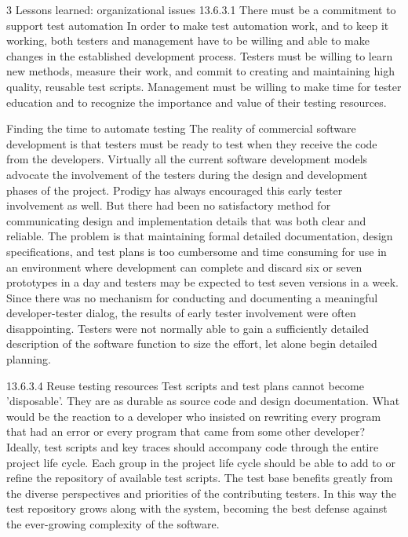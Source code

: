 3 Lessons learned: organizational issues
13.6.3.1 There must be a commitment to support test automation
In order to make test automation work, and to keep it working, both testers
and management have to be willing and able to make changes in the established
development process.
Testers must be willing to learn new methods, measure their work, and
commit to creating and maintaining high quality, reusable test scripts.
Management must be willing to make time for tester education and to
recognize the importance and value of their testing resources. 

Finding the time to automate testing
The reality of commercial software development is that testers must be
ready to test when they receive the code from the developers.
Virtually all the current software development models advocate the
involvement of the testers during the design and development phases of the
project. Prodigy has always encouraged this early tester involvement as
well. But there had been no satisfactory method for communicating design
and implementation details that was both clear and reliable.
The problem is that maintaining formal detailed documentation, design
specifications, and test plans is too cumbersome and time consuming for
use in an environment where development can complete and discard six or
seven prototypes in a day and testers may be expected to test seven versions
in a week.
Since there was no mechanism for conducting and documenting a
meaningful developer-tester dialog, the results of early tester involvement
were often disappointing. Testers were not normally able to gain a sufficiently
detailed description of the software function to size the effort, let
alone begin detailed planning. 

13.6.3.4 Reuse testing resources
Test scripts and test plans cannot become 'disposable'. They are as durable
as source code and design documentation. What would be the reaction to a
developer who insisted on rewriting every program that had an error or
every program that came from some other developer?
Ideally, test scripts and key traces should accompany code through the
entire project life cycle. Each group in the project life cycle should be able
to add to or refine the repository of available test scripts.
The test base benefits greatly from the diverse perspectives and priorities
of the contributing testers. In this way the test repository grows along
with the system, becoming the best defense against the ever-growing complexity
of the software. 

